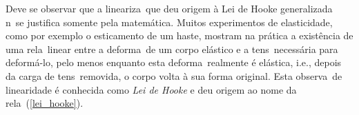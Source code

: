 Deve se observar que a lineariza\cao\ que deu origem \`a Lei de Hooke
generalizada n\ao\ se justifica somente pela matem\'atica. Muitos
experimentos de elasticidade, como por exemplo o esticamento de um
haste, mostram na pr\'atica a exist\^encia de uma rela\cao\ linear entre
a deforma\cao\ de um corpo el\'astico e a tens\ao\ necess\'aria para
deform\'a-lo, pelo menos enquanto esta deforma\cao\ realmente \'e
el\'astica, i.e., depois da carga de tens\ao\ removida, o corpo volta
\`a sua forma original. Esta observa\cao\ de linearidade \'e conhecida
como {\em Lei de Hooke} e deu origem ao nome da rela\cao\
(\ref{lei_hooke}).

